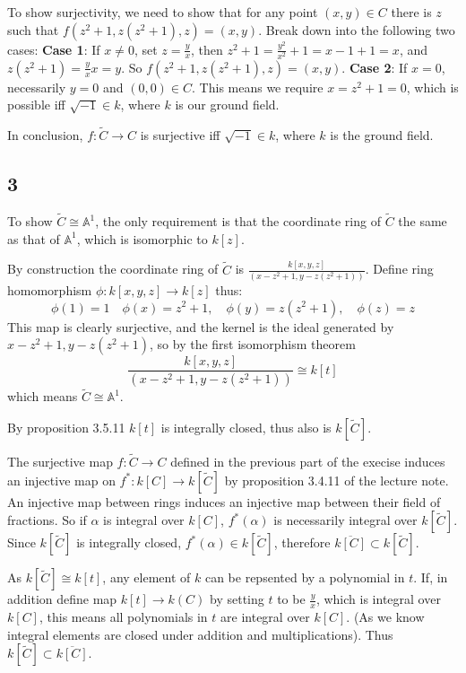 \documentclass{article}
\theoremstyle{definition}
\theoremstyle{definition}
\theoremstyle{remark}
\begin{document}
To show surjectivity, we need to show that for any point $(x,y) \in C$ there is $z$ such that $f(z^2+1, z(z^2+1), z) = (x,y)$. 
Break down into the following two cases:
\textbf{Case 1}:
If $x \neq 0$, set $z = \frac{y}{x}$, then $z^2 + 1 = \frac{y^2}{x^2} + 1 = x- 1 +1 = x$, and $z(z^2 + 1) = \frac{y}{x}x = y$. So $f(z^2+1, z(z^2+1), z) = (x,y)$.
\textbf{Case 2}:
If $x= 0$, necessarily $y = 0$ and $(0, 0) \in C$.
This means we require $x = z^2 + 1 = 0$,  which is possible iff $\sqrt{-1} \in k$, where $k$ is our ground field. 

In conclusion, $f: \tilde{C} \to C$ is surjective iff $\sqrt{-1} \in k$, where $k$ is the ground field.


\subsection*{3}
To show $\tilde{C} \cong \mathbb{A}^1$, the only requirement is that the coordinate ring of $\tilde{C}$ the same as that of  $\mathbb{A}^1$, which is isomorphic to $k[z]$.

By construction the coordinate ring of $\tilde{C}$ is $\frac{k[x,y,z]}{(x-z^2+1, y-z(z^2+1))}$.
Define ring homomorphism $\phi: k[x,y,z] \rightarrow k[z]$ thus:
$$
	\phi(1) = 1 \quad \phi(x) = z^2 + 1, \quad \phi(y) = z(z^2 + 1), \quad \phi(z) = z
$$
This map is clearly surjective, and the kernel is the ideal generated by $x-z^2+1, y-z(z^2+1)$, so by the first isomorphism theorem 
$$
\frac{k[x,y,z]}{(x-z^2+1, y-z(z^2+1))} \cong k[t]
$$
which means $\tilde{C} \cong \mathbb{A}^1$.

By proposition 3.5.11 $k[t]$ is integrally closed, thus also is $k[\tilde{C}]$.

The surjective map $f: \tilde{C} \rightarrow C$ defined in the previous part of the execise induces an injective map on $f^*: k[C] \rightarrow k[\tilde{C}]$ by proposition 3.4.11 of the lecture note. 
An injective map between rings induces an injective map between their field of fractions. 
So if $\alpha$ is integral over $k[C]$, $f^*(\alpha)$ is necessarily integral over $k[\tilde{C}]$. 
Since $k[\tilde{C}]$ is integrally closed, $f^*(\alpha) \in k[\tilde{C}]$, therefore $\overline{k[C]} \subset k[\tilde{C}]$.

As $k[\tilde{C}] \cong k[t]$, any element of $k$ can be repsented by a polynomial in $t$. 
If, in addition define map $k[t] \rightarrow k(C)$ by setting $t$ to be $\frac{y}{x}$, which is integral over $k[C]$, this means all polynomials in $t$ are integral over $k[C]$. (As we know integral elements are closed under addition and multiplications). 
Thus $k[\tilde{C}] \subset \overline{k[C]}$.
\end{document}
